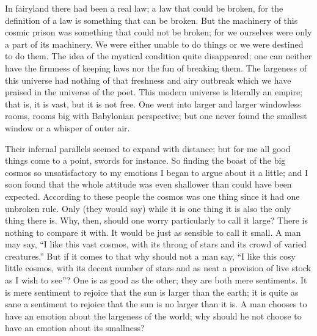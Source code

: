 \documentclass{book}
\begin{document}
In fairyland there had been a real law; a law that could be broken, for the definition of a law is something that can be broken. But the machinery of this cosmic prison was something that could not be broken; for we ourselves were only a part of its machinery. We were either unable to do things or we were destined to do them. The idea of the mystical condition quite disappeared; one can neither have the firmness of keeping laws nor the fun of breaking them. The largeness of this universe had nothing of that freshness and airy outbreak which we have praised in the universe of the poet. This modern universe is literally an empire; that is, it is vast, but it is not free. One went into larger and larger windowless rooms, rooms big with Babylonian perspective; but one never found the smallest window or a whisper of outer air.

Their infernal parallels seemed to expand with distance; but for me all good things come to a point, swords for instance. So finding the boast of the big cosmos so unsatisfactory to my emotions I began to argue about it a little; and I soon found that the whole attitude was even shallower than could have been expected. According to these people the cosmos was one thing since it had one unbroken rule. Only (they would say) while it is one thing it is also the only thing there is. Why, then, should one worry particularly to call it large? There is nothing to compare it with. It would be just as sensible to call it small. A man may say, “I like this vast cosmos, with its throng of stars and its crowd of varied creatures.” But if it comes to that why should not a man say, “I like this cosy little cosmos, with its decent number of stars and as neat a provision of live stock as I wish to see”? One is as good as the other; they are both mere sentiments. It is mere sentiment to rejoice that the sun is larger than the earth; it is quite as sane a sentiment to rejoice that the sun is no larger than it is. A man chooses to have an emotion about the largeness of the world; why should he not choose to have an emotion about its smallness?
\end{document}
